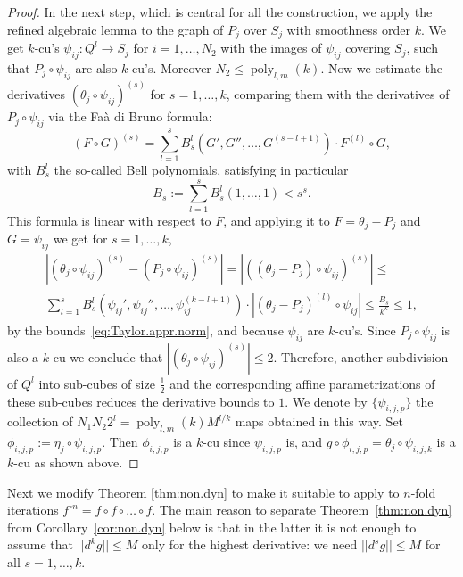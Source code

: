 \documentclass[reqno]{amsart}
\renewcommand\~[1]{\widetilde{#1}}
\def\poly{\operatorname{poly}} \def\J{\operatorname{J}}
\begin{document}
\begin{proof}
  In the next step, which is central for all the construction, we
  apply the refined algebraic lemma to the graph of $P_j$ over $S_j$
  with smoothness order $k$. We get $k$-cu's $\psi_{ij}:Q^l\to S_j$
  for $i=1,\ldots,N_2$ with the images of $\psi_{ij}$ covering $S_j$,
  such that $P_j\circ \psi_{ij}$ are also $k$-cu's. Moreover
  $N_2\le\poly_{l,m}(k)$. Now we estimate the derivatives
  $(\theta_j\circ \psi_{ij})^{(s)}$ for $s=1,\ldots,k$, comparing them
  with the derivatives of $P_j\circ \psi_{ij}$ via the Fa\`a di Bruno
  formula:
  \begin{equation}\label{eq:Faa.di.Bruno1}
    (F\circ G)^{(s)}= \sum_{l=1}^s B_s^l(G',G'',\ldots,G^{(s-l+1)})\cdot F^{(l)}\circ G,
  \end{equation}
  with $B^l_s$ the so-called Bell polynomials, satisfying in
  particular
  \begin{equation}
    B_s:=\sum_{l=1}^s B^l_s(1,\ldots,1)<s^s.
  \end{equation}
  This formula is linear with respect to $F$, and applying it to
  $F=\theta_j-P_j$ and $G=\psi_{ij}$ we get for $s=1,\ldots,k$,
  \begin{multline}
    |(\theta_j\circ \psi_{ij})^{(s)}- (P_j\circ \psi_{ij})^{(s)}|= |((\theta_j-P_j)\circ \psi_{ij})^{(s)}|\leq \\
    \sum_{l=1}^s B_s^l(\psi_{ij}',\psi_{ij}'',\ldots,\psi_{ij}^{(k-l+1)})\cdot |(\theta_j-P_j)^{(l)}\circ \psi_{ij}| \le 
    \frac{B_s}{k^k}\le 1,
  \end{multline}
  by the bounds~\eqref{eq:Taylor.appr.norm}, and because $\psi_{ij}$
  are $k$-cu's. Since $P_j\circ \psi_{ij}$ is also a $k$-cu we
  conclude that $|(\theta_j\circ \psi_{ij})^{(s)}|\le2$. Therefore,
  another subdivision of $Q^l$ into sub-cubes of size $\frac{1}{2}$
  and the corresponding affine parametrizations of these sub-cubes
  reduces the derivative bounds to $1$. We denote by
  $\{\psi_{i,j,p}\}$ the collection of
  $N_1N_2 2^l=\poly_{l,m}(k)M^{l/k}$ maps obtained in this way. Set
  $\phi_{i,j,p}:=\eta_j\circ\psi_{i,j,p}$. Then $\phi_{i,j,p}$ is a
  $k$-cu since $\psi_{i,j,p}$ is, and
  $g\circ\phi_{i,j,p}=\theta_j\circ\psi_{i,j,k}$ is a $k$-cu as shown
  above.
\end{proof}

Next we modify Theorem \ref{thm:non.dyn} to make it suitable to apply
to $n$-fold iterations
$f^{\circ n}=f\circ f \circ \ldots \circ f$. The main reason to
separate Theorem~\ref{thm:non.dyn} from Corollary~\ref{cor:non.dyn}
below is that in the latter it is not enough to assume that
$||d^kg||\le M$ only for the highest derivative: we need
$||d^sg||\le M$ for all $s=1,\ldots,k$.
\end{document}
